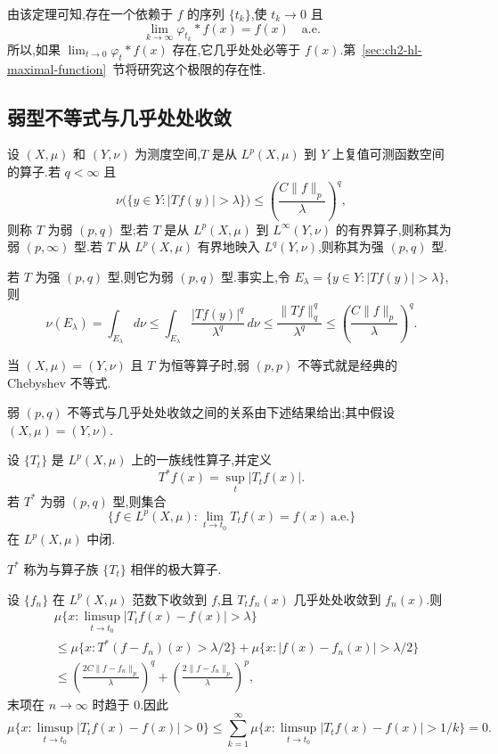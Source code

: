 由该定理可知,存在一个依赖于 $f$ 的序列 $\{t_k\}$,使 $t_k\to0$ 且
\[
 \lim_{k\to\infty}\varphi_{t_k}*f(x)=f(x)\quad\text{a.e.}
\]
所以,如果 $\lim_{t\to0}\varphi_t*f(x)$ 存在,它几乎处处必等于 $f(x)$.第~\ref{sec:ch2-hl-maximal-function}~节将研究这个极限的存在性.

\subsection{弱型不等式与几乎处处收敛}
\label{sec:ch2-weak-type-ae}

设 $(X,\mu)$ 和 $(Y,\nu)$ 为测度空间,$T$ 是从 $L^p(X,\mu)$ 到 $Y$ 上复值可测函数空间的算子.若 $q<\infty$ 且
\[
 \nu\bigl(\{y\in Y:|Tf(y)|>\lambda\}\bigr)
 \le \left(\frac{C\|f\|_p}{\lambda}\right)^q,
\]
则称 $T$ 为弱 $(p,q)$ 型;若 $T$ 是从 $L^p(X,\mu)$ 到 $L^\infty(Y,\nu)$ 的有界算子,则称其为弱 $(p,\infty)$ 型.若 $T$ 从 $L^p(X,\mu)$ 有界地映入 $L^q(Y,\nu)$,则称其为强 $(p,q)$ 型.

若 $T$ 为强 $(p,q)$ 型,则它为弱 $(p,q)$ 型.事实上,令 $E_\lambda=\{y\in Y:|Tf(y)|>\lambda\}$,则
\[
 \nu(E_\lambda)=\int_{E_\lambda}d\nu
 \le \int_{E_\lambda}\frac{|Tf(y)|^q}{\lambda^q}\,d\nu
 \le \frac{\|Tf\|_q^q}{\lambda^q}
 \le \left(\frac{C\|f\|_p}{\lambda}\right)^q.
\]

\hypertarget{sample-page-039}{}
当 $(X,\mu)=(Y,\nu)$ 且 $T$ 为恒等算子时,弱 $(p,p)$ 不等式就是经典的 Chebyshev 不等式.

弱 $(p,q)$ 不等式与几乎处处收敛之间的关系由下述结果给出;其中假设 $(X,\mu)=(Y,\nu)$.

\begin{Theorem}
\label{thm:ch2-closed-ae-convergence-set}
设 $\{T_t\}$ 是 $L^p(X,\mu)$ 上的一族线性算子,并定义
\[
 T^*f(x)=\sup_t|T_tf(x)|.
\]
若 $T^*$ 为弱 $(p,q)$ 型,则集合
\[
 \{f\in L^p(X,\mu):\lim_{t\to t_0}T_tf(x)=f(x)\ \text{a.e.}\}
\]
在 $L^p(X,\mu)$ 中闭.
\end{Theorem}

$T^*$ 称为与算子族 $\{T_t\}$ 相伴的极大算子.

\begin{Proof}
设 $\{f_n\}$ 在 $L^p(X,\mu)$ 范数下收敛到 $f$,且 $T_tf_n(x)$ 几乎处处收敛到 $f_n(x)$.则
\[
\begin{aligned}
 &\mu\{x:\limsup_{t\to t_0}|T_tf(x)-f(x)|>\lambda\}\\
 &\le \mu\{x:T^*(f-f_n)(x)>\lambda/2\}
 +\mu\{x:|f(x)-f_n(x)|>\lambda/2\}\\
 &\le \left(\frac{2C\|f-f_n\|_p}{\lambda}\right)^q
 +\left(\frac{2\|f-f_n\|_p}{\lambda}\right)^p,
\end{aligned}
\]
末项在 $n\to\infty$ 时趋于 $0$.因此
\[
 \mu\{x:\limsup_{t\to t_0}|T_tf(x)-f(x)|>0\}
 \le\sum_{k=1}^{\infty}\mu\{x:\limsup_{t\to t_0}|T_tf(x)-f(x)|>1/k\}=0.
\]
\end{Proof}


